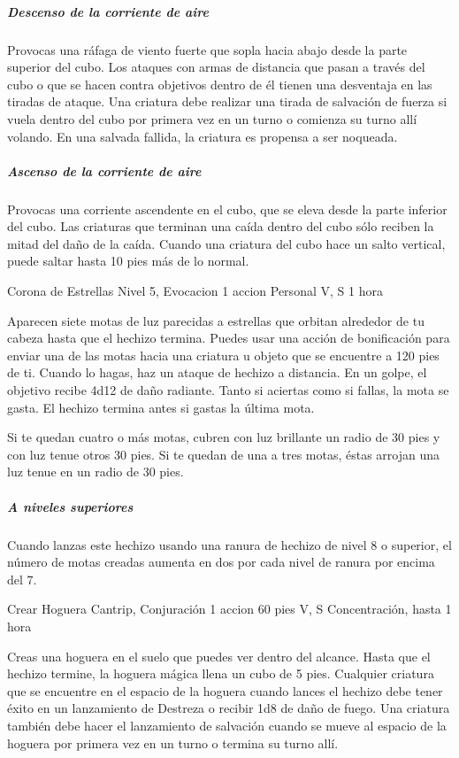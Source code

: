 \documentclass[a4paper,twocolumn,openany,10pt]{dndbook}
\begin{document}
	\subparagraph{Descenso de la corriente de aire} Provocas una ráfaga de viento fuerte que sopla hacia abajo desde la parte
	superior del cubo. Los ataques con armas de distancia que pasan a través del cubo o que se hacen contra objetivos dentro de
	él tienen una desventaja en las tiradas de ataque. Una criatura debe realizar una tirada de salvación de fuerza si vuela
	dentro del cubo por primera vez en un turno o comienza su turno allí volando. En una salvada fallida, la criatura es
	propensa a ser noqueada.

	\subparagraph{Ascenso de la corriente de aire} Provocas una corriente ascendente en el cubo, que se eleva desde la parte
	inferior del cubo. Las criaturas que terminan una caída dentro del cubo sólo reciben la mitad del daño de la caída. Cuando
	una criatura del cubo hace un salto vertical, puede saltar hasta 10 pies más de lo normal. 

\spellheader%
	{Corona de Estrellas}
	{Nivel 5, Evocacion}
	{1 accion}
	{Personal}
	{V, S}
	{1 hora}
	
	Aparecen siete motas de luz parecidas a estrellas que orbitan alrededor de tu cabeza hasta que el hechizo termina. Puedes
	usar una acción de bonificación para enviar una de las motas hacia una criatura u objeto que se encuentre a 120 pies de ti.
	Cuando lo hagas, haz un ataque de hechizo a distancia. En un golpe, el objetivo recibe 4d12 de daño radiante. Tanto si
	aciertas como si fallas, la mota se gasta. El hechizo termina antes si gastas la última mota.
	
	Si te quedan cuatro o más motas, cubren con luz brillante un radio de 30 pies y con luz tenue otros 30 pies. Si te quedan de
	una a tres motas, éstas arrojan una luz tenue en un radio de 30 pies.

	\subparagraph{A niveles superiores} Cuando lanzas este hechizo usando una ranura de hechizo de nivel 8 o superior, el número
	de motas creadas aumenta en dos por cada nivel de ranura por encima del 7. 

\spellheader%
	{Crear Hoguera}
	{Cantrip, Conjuración}
	{1 accion}
	{60 pies}
	{V, S}
	{Concentración, hasta 1 hora}
	
	Creas una hoguera en el suelo que puedes ver dentro del alcance. Hasta que el hechizo termine, la hoguera mágica llena un
	cubo de 5 pies. Cualquier criatura que se encuentre en el espacio de la hoguera cuando lances el hechizo debe tener éxito en
	un lanzamiento de Destreza o recibir 1d8 de daño de fuego. Una criatura también debe hacer el lanzamiento de salvación
	cuando se mueve al espacio de la hoguera por primera vez en un turno o termina su turno allí.
	
\end{document}

